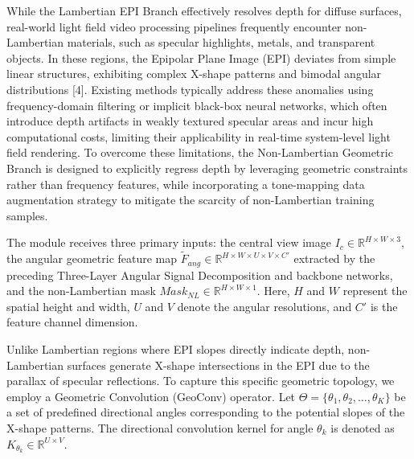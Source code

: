While the Lambertian EPI Branch effectively resolves depth for diffuse surfaces, real-world light field video processing pipelines frequently encounter non-Lambertian materials, such as specular highlights, metals, and transparent objects. In these regions, the Epipolar Plane Image (EPI) deviates from simple linear structures, exhibiting complex X-shape patterns and bimodal angular distributions [4]. Existing methods typically address these anomalies using frequency-domain filtering or implicit black-box neural networks, which often introduce depth artifacts in weakly textured specular areas and incur high computational costs, limiting their applicability in real-time system-level light field rendering. To overcome these limitations, the Non-Lambertian Geometric Branch is designed to explicitly regress depth by leveraging geometric constraints rather than frequency features, while incorporating a tone-mapping data augmentation strategy to mitigate the scarcity of non-Lambertian training samples.

The module receives three primary inputs: the central view image $I_c \in \mathbb{R}^{H \times W \times 3}$, the angular geometric feature map $\tilde{F}_{ang} \in \mathbb{R}^{H \times W \times U \times V \times C'}$ extracted by the preceding Three-Layer Angular Signal Decomposition and backbone networks, and the non-Lambertian mask $Mask_{NL} \in \mathbb{R}^{H \times W \times 1}$. Here, $H$ and $W$ represent the spatial height and width, $U$ and $V$ denote the angular resolutions, and $C'$ is the feature channel dimension. 

Unlike Lambertian regions where EPI slopes directly indicate depth, non-Lambertian surfaces generate X-shape intersections in the EPI due to the parallax of specular reflections. To capture this specific geometric topology, we employ a Geometric Convolution (GeoConv) operator. Let $\Theta = \{\theta_1, \theta_2, \dots, \theta_K\}$ be a set of predefined directional angles corresponding to the potential slopes of the X-shape patterns. The directional convolution kernel for angle $\theta_k$ is denoted as $K_{\theta_k} \in \mathbb{R}^{U \times V}$. 

